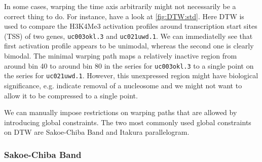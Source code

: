 \documentclass[parskip]{cs4rep}
\newcommand{\gene}[1]{{\tt #1}}
\newcommand{\histonemodification}[1]{#1}
\begin{document}
In some cases, warping the time axis arbitrarily might not necessarily be a correct thing to do.
For instance, have a look at \autoref{fig:DTW:std}. Here DTW is used to compare the \histonemodification{H3K4Me3} activation profiles around transcription start sites (TSS) of two genes, \gene{uc003okl.3} and \gene{uc021uwd.1}. We can immediatelly see that first activation profile appears to be unimodal, whereas the second one is clearly bimodal. The minimal warping path maps a relatively inactive region from around bin 40 to around bin 80 in the series for \gene{uc003okl.3} to a single point on the series for \gene{uc021uwd.1}. However, this unexpressed region might have biological significance, e.g.  indicate removal of a nucleosome and we might not want to allow it to be compressed to a single point. 

We can manually impose restrictions on warping paths that are allowed by introducing global constraints. The two most commonly used global constraints on DTW are Sakoe-Chiba Band and Itakura parallelogram\citep{Ratanamahatana:2004wu}.

\subsubsection{Sakoe-Chiba Band}
\end{document}
